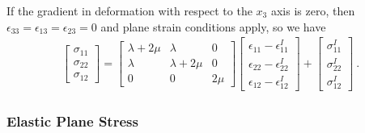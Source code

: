 If the gradient in deformation with respect to the $x_{3}$ axis is
zero, then $\epsilon_{33}=\epsilon_{13}=\epsilon_{23}=0$ and plane
strain conditions apply, so we have 
\begin{gather}
\left[\begin{array}{c}
\sigma_{11}\\
\sigma_{22}\\
\sigma_{12}
\end{array}\right]=\left[\begin{array}{ccc}
\lambda+2\mu & \lambda & 0\\
\lambda & \lambda+2\mu & 0\\
0 & 0 & 2\mu
\end{array}\right]\left[\begin{array}{c}
\epsilon_{11}-\epsilon_{11}^{I}\\
\epsilon_{22}-\epsilon_{22}^{I}\\
\epsilon_{12}-\epsilon_{12}^{I}
\end{array}\right]+\left[\begin{array}{c}
\sigma_{11}^{I}\\
\sigma_{22}^{I}\\
\sigma_{12}^{I}
\end{array}\right]\:.\label{eq:10}
\end{gather}


\subsubsection{Elastic Plane Stress}

